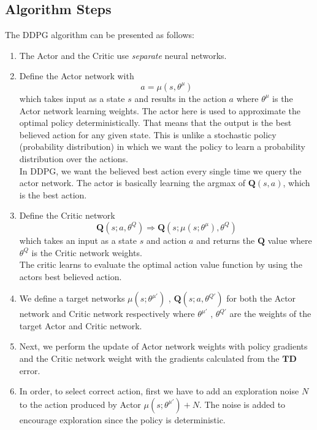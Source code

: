 \subsection{Algorithm Steps}
The DDPG algorithm can be presented as follows:
\begin{enumerate}
    \item The Actor and the Critic use \emph{separate} neural networks.
    \item Define the Actor network with
    \begin{equation}
        \label{eq:Actor network}
        a = \mu(s, \theta^\mu)
    \end{equation}
    which takes input as a state $s$ and results in the action $a$ where $\theta^\mu$ is the Actor network learning weights. The actor here is used to approximate the optimal policy deterministically. That means that the output is the best believed action for any given state. This is unlike a stochastic policy (probability distribution) in which we want the policy to learn a probability distribution over the actions. \\
    In DDPG, we want the believed best action every single time we query the actor network. The actor is basically learning the argmax of $\mathbf{Q}\left(s,a\right)$, which is the best action.
    \item Define the Critic network
    \begin{equation}
        \label{eq:Critic network}
        \mathbf{Q}\left( s; a, \theta^Q \right) \Rightarrow \mathbf{Q}\left( s; \mu(s; \theta^\mu), \theta^Q \right)
    \end{equation}
    which takes an input as a state $s$ and action $a$ and returns the $\mathbf{Q}$ value where $\theta^Q$ is the Critic network weights. \\
    The critic learns to evaluate the optimal action value function by using the actors best believed action.
    \item We define a target networks $\mu(s;\theta^{\mu'})$ , $\mathbf{Q}\left( s; a, \theta^{Q'} \right)$ for both the Actor network and Critic network respectively where $\theta^{\mu'}$ , $\theta^{Q'}$ are the weights of the target Actor and Critic network.
    \item Next, we perform the update of Actor network weights with policy gradients and the Critic network weight with the gradients calculated from the $\mathbf{T}\mathbf{D}$ error.
    \item In order, to select correct action, first we have to add an exploration noise $N$ to the action produced by Actor $\mu(s;\theta^{\mu'}) + N$. The noise is added to encourage exploration since the policy is deterministic.

\end{enumerate}
